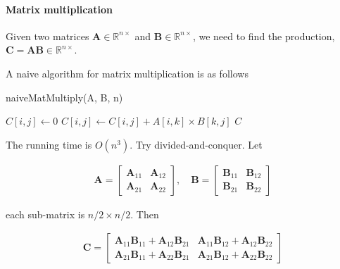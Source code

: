                 \paragraph{Matrix multiplication}
                    Given two matrices $\mathbf{A} \in \mathbb{R}^{n\times}$ and $\mathbf{B} \in \mathbb{R}^{n\times}$, we need to find the production, $\mathbf{C} = \mathbf{AB} \in \mathbb{R}^{n\times}$.

                    A naive algorithm for matrix multiplication is as follows

                    \begin{algorithm}[H]
                        \caption{naiveMatMultiply(A, B, n)}
                        \begin{algorithmic}[1]
                                    \State $C[i, j] \gets 0$
                                        \State $C[i, j] \gets C[i, j] + A[i, k] \times B[k, j]$
                                    \EndFor
                                \EndFor
                            \EndFor
                            \State \Return $C$
                        \end{algorithmic}
                    \end{algorithm}

                    The running time is $O(n^3)$. Try divided-and-conquer. Let

                    \begin{align*}
                        \mathbf{A} = \begin{bmatrix}
                            \mathbf{A}_{11} & \mathbf{A}_{12}\\
                            \mathbf{A}_{21} & \mathbf{A}_{22}
                        \end{bmatrix}, \quad
                        \mathbf{B} = \begin{bmatrix}
                            \mathbf{B}_{11} & \mathbf{B}_{12}\\
                            \mathbf{B}_{21} & \mathbf{B}_{22}
                        \end{bmatrix}
                    \end{align*}

                    each sub-matrix is $n/2 \times n/2$. Then

                    \begin{align*}
                        \mathbf{C} = \begin{bmatrix}
                            \mathbf{A}_{11}\mathbf{B}_{11} + \mathbf{A}_{12}\mathbf{B}_{21} &
                            \mathbf{A}_{11}\mathbf{B}_{12} + \mathbf{A}_{12}\mathbf{B}_{22} \\
                            \mathbf{A}_{21}\mathbf{B}_{11} + \mathbf{A}_{22}\mathbf{B}_{21} & 
                            \mathbf{A}_{21}\mathbf{B}_{12} + \mathbf{A}_{22}\mathbf{B}_{22}
                        \end{bmatrix}
                    \end{align*}

